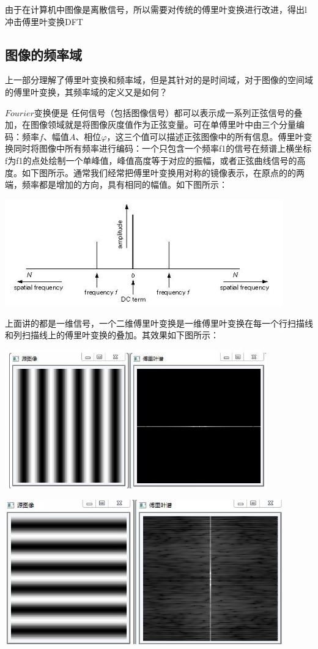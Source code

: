 \documentclass[a4paper,16pt,UTF8]{article}
\begin{document}
由于在计算机中图像是离散信号，所以需要对传统的傅里叶变换进行改进，得出l冲击傅里叶变换DFT

\subsection{\large 图像的频率域}

上一部分理解了傅里叶变换和频率域，但是其针对的是时间域，对于图像的空间域的傅里叶变换，其频率域的定义又是如何？

$Fourier$变换便是
任何信号（包括图像信号）都可以表示成一系列正弦信号的叠加，在图像领域就是将图像灰度值作为正弦变量。可在单傅里叶中由三个分量编码：频率$f$、幅值$A$、相位$\varphi$，这三个值可以描述正弦图像中的所有信息。傅里叶变换同时将图像中所有频率进行编码：一个只包含一个频率f1的信号在频谱上横坐标f为f1的点处绘制一个单峰值，峰值高度等于对应的振幅，或者正弦曲线信号的高度。如下图所示。通常我们经常把傅里叶变换用对称的镜像表示，在原点的的两端，频率都是增加的方向，具有相同的幅值。如下图所示：

\includegraphics[width = 0.9\textwidth]{dft01.jpg}

上面讲的都是一维信号，一个二维傅里叶变换是一维傅里叶变换在每一个行扫描线和列扫描线上的傅里叶变换的叠加。其效果如下图所示：

\includegraphics[width = 0.85\textwidth]{dft02.jpg}

\includegraphics[width = 0.9\textwidth]{dft03.jpg}
\end{document}
